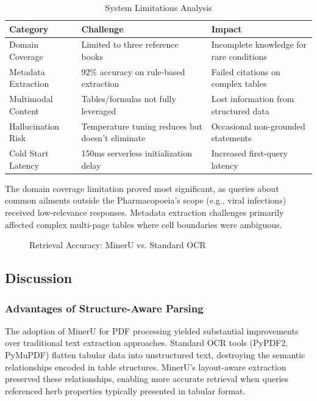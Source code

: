 \documentclass[conference]{IEEEtran}
\begin{document}
\begin{table}[htbp]
\caption{System Limitations Analysis}
\begin{center}
\begin{tabular}{|l|p{2.5cm}|p{2.5cm}|}
\hline
\textbf{Category} & \textbf{Challenge} & \textbf{Impact} \\
\hline
Domain Coverage & Limited to three reference books & Incomplete knowledge for rare conditions \\
\hline
Metadata Extraction & 92\% accuracy on rule-based extraction & Failed citations on complex tables \\
\hline
Multimodal Content & Tables/formulas not fully leveraged & Lost information from structured data \\
\hline
Hallucination Risk & Temperature tuning reduces but doesn't eliminate & Occasional non-grounded statements \\
\hline
Cold Start Latency & 150ms serverless initialization delay & Increased first-query latency \\
\hline
\end{tabular}
\label{tab:limitations}
\end{center}
\end{table}

The domain coverage limitation proved most significant, as queries about common ailments outside the Pharmacopoeia's scope (e.g., viral infections) received low-relevance responses. Metadata extraction challenges primarily affected complex multi-page tables where cell boundaries were ambiguous.

\begin{figure}[htbp]
\centerline{}
\caption{Retrieval Accuracy: MinerU vs. Standard OCR}
\label{fig:accuracy}
\end{figure}

\subsection{Discussion}

\subsubsection{Advantages of Structure-Aware Parsing}
The adoption of MinerU for PDF processing yielded substantial improvements over traditional text extraction approaches. Standard OCR tools (PyPDF2, PyMuPDF) flatten tabular data into unstructured text, destroying the semantic relationships encoded in table structures. MinerU's layout-aware extraction preserved these relationships, enabling more accurate retrieval when queries referenced herb properties typically presented in tabular format.
\end{document}
